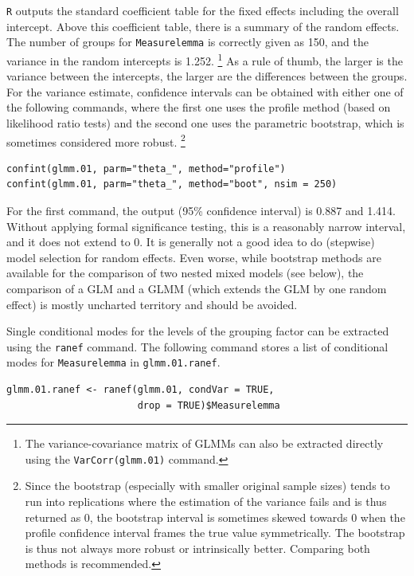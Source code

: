 \texttt{R} outputs the standard coefficient table for the fixed effects including the overall intercept.
Above this coefficient table, there is a summary of the random effects.
The number of groups for \texttt{Measurelemma} is correctly given as 150, and the variance in the random intercepts is 1.252.%
\footnote{The variance-covariance matrix of GLMMs can also be extracted directly using the \texttt{VarCorr(glmm.01)} command.}
As a rule of thumb, the larger is the variance between the intercepts, the larger are the differences between the groups.
For the variance estimate, confidence intervals can be obtained with either one of the following commands, where the first one uses the profile method (based on likelihood ratio tests) and the second one uses the parametric bootstrap, which is sometimes considered more robust.%
\footnote{Since the bootstrap (especially with smaller original sample sizes) tends to run into replications where the estimation of the variance fails and is thus returned as 0, the bootstrap interval is sometimes skewed towards 0 when the profile confidence interval frames the true value symmetrically. The bootstrap is thus not always more robust or intrinsically better.
Comparing both methods is recommended.}

\vspace{0.5\baselineskip}

\begin{lstlisting}
confint(glmm.01, parm="theta_", method="profile")
confint(glmm.01, parm="theta_", method="boot", nsim = 250)
\end{lstlisting}

For the first command, the output (95\% confidence interval) is 0.887 and 1.414.
Without applying formal significance testing, this is a reasonably narrow interval, and it does not extend to 0.
It is generally not a good idea to do (stepwise) model selection for random effects.
Even worse, while bootstrap methods are available for the comparison of two nested mixed models (see below), the comparison of a GLM and a GLMM (which extends the GLM by one random effect) is mostly uncharted territory and should be avoided.

Single conditional modes for the levels of the grouping factor can be extracted using the \texttt{ranef} command.
The following command stores a list of conditional modes for \texttt{Measurelemma} in \texttt{glmm.01.ranef}.

\vspace{0.5\baselineskip}

\begin{lstlisting}
glmm.01.ranef <- ranef(glmm.01, condVar = TRUE,
                       drop = TRUE)$Measurelemma
\end{lstlisting}

